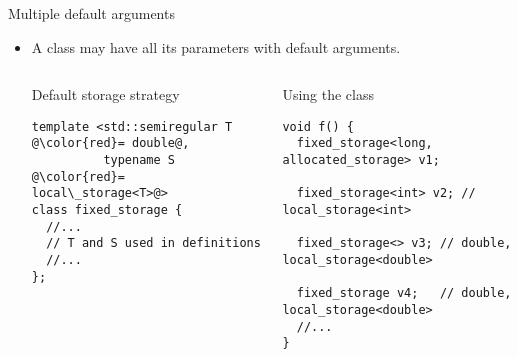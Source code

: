 \begin{frame}[t,fragile]{Multiple default arguments}
\begin{itemize}
  \item A class may have all its parameters with default arguments.

\begin{columns}[T]

\begin{block}{Default storage strategy}
\begin{lstlisting}[escapechar=@]
template <std::semiregular T @\color{red}= double@, 
          typename S @\color{red}= local\_storage<T>@>
class fixed_storage {
  //...
  // T and S used in definitions
  //...
};
\end{lstlisting}
\end{block}

\pause
{}
\begin{block}{Using the class}
\begin{lstlisting}
void f() {
  fixed_storage<long, allocated_storage> v1;

  fixed_storage<int> v2; // local_storage<int>

  fixed_storage<> v3; // double, local_storage<double>

  fixed_storage v4;   // double, local_storage<double>
  //...
}
\end{lstlisting}
\end{block}

\end{columns}

\end{itemize}
\end{frame}
